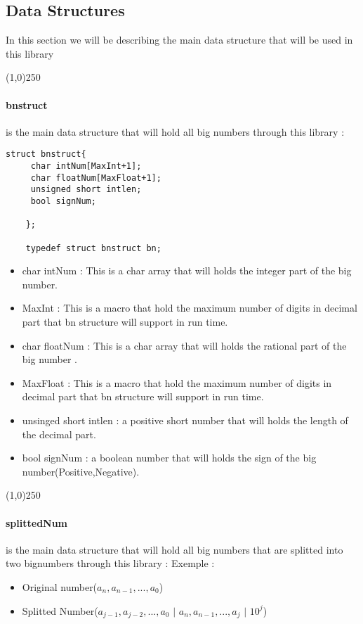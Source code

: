 \subsection{Data Structures}
In this section we will be describing the main data structure that will be used in this library 
\begin{center}
	\line(1,0){250}
\end{center}
\paragraph{bnstruct} is the main data structure that will hold all big numbers through this library :
\begin{lstlisting}[style=CStyle]
	struct bnstruct{
	 char intNum[MaxInt+1];
	 char floatNum[MaxFloat+1];
	 unsigned short intlen;
	 bool signNum;
	
	};
	
	typedef struct bnstruct bn;
\end{lstlisting}

\begin{itemize}
	\item char intNum : This is a char array that will holds the integer part of the big number.
	\item MaxInt : This is a macro that hold the maximum number of digits in decimal part that bn structure will support in run time. 
	\item char floatNum : This is a char array that will holds the rational part of the big number .
	\item MaxFloat : This is a macro that hold the maximum number of digits in decimal part that bn structure will support in run time.
	\item unsinged short intlen : a positive short number that will holds the length of the decimal part.
	\item bool signNum : a boolean number that will holds the sign of the big number(Positive,Negative).
\end{itemize}
\begin{center}
	\line(1,0){250}
\end{center}
\paragraph{splittedNum} is the main data structure that will hold all big numbers that are splitted into two bignumbers through this library :\newline\newline
Exemple : 
\begin{itemize}
	\item Original number($a_{n},a_{n-1},...,a_{0}$)
	\item Splitted Number($a_{j-1},a_{j-2},...,a_{0}$ $|$ $a_{n},a_{n-1},...,a_{j}$ $|$ $10^{j}$)
\end{itemize}





